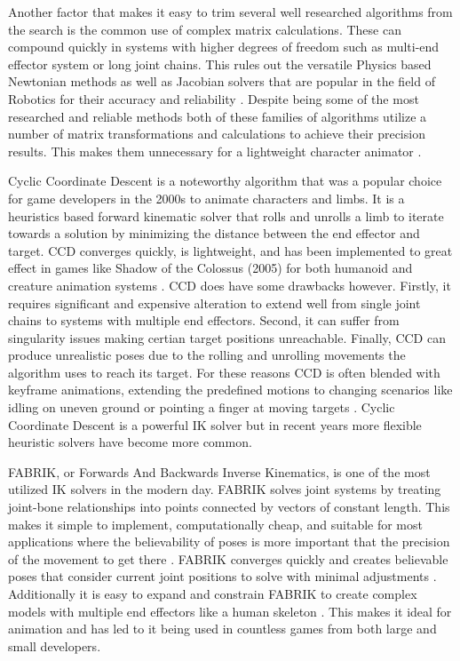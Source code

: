 \documentclass[10pt,twocolumn]{article}
\begin{document}
Another factor that makes it easy to trim several well researched algorithms from the search is the common use of complex matrix calculations. These can compound quickly in systems with higher degrees of freedom such as multi-end effector system or long joint chains. This rules out the versatile Physics based Newtonian methods as well as Jacobian solvers that are popular in the field of Robotics for their accuracy and reliability \cite{newtonian}\cite{jacobianSingularity}. Despite being some of the most researched and reliable methods both of these families of algorithms utilize a number of matrix transformations and calculations to achieve their precision results. This makes them unnecessary for a lightweight character animator \cite{litReview}.

Cyclic Coordinate Descent is a noteworthy algorithm that was a popular choice for game developers in the 2000s to animate characters and limbs. It is a heuristics based forward kinematic solver that rolls and unrolls a limb to iterate towards a solution by minimizing the distance between the end effector and target\cite{CCDBlog}. CCD converges quickly, is lightweight, and has been implemented to great effect in games like Shadow of the Colossus (2005) for both humanoid and creature animation systems \cite{ShadowofC}. CCD does have some drawbacks however. Firstly, it requires significant and expensive alteration to extend well from single joint chains to systems with multiple end effectors. Second, it can suffer from singularity issues making certian target positions unreachable. Finally, CCD can produce unrealistic poses due to the rolling and unrolling movements the algorithm uses to reach its target. For these reasons CCD is often blended with keyframe animations, extending the predefined motions to changing scenarios like idling on uneven ground or pointing a finger at moving targets \cite{baseFABRIK} \cite{CCDpaper}. Cyclic Coordinate Descent is a powerful IK solver but in recent years more flexible heuristic solvers have become more common.

FABRIK, or Forwards And Backwards Inverse Kinematics, is one of the most utilized IK solvers in the modern day. FABRIK solves joint systems by treating joint-bone relationships into points connected by vectors of constant length. This makes it simple to implement, computationally cheap, and suitable for most applications where the believability of poses is more important that the precision of the movement to get there \cite{FABRIKoptimized}. FABRIK converges quickly and creates believable poses that consider current joint positions to solve with minimal adjustments \cite{baseFABRIK}. Additionally it is easy to expand and constrain FABRIK to create complex models with multiple end effectors like a human skeleton \cite{extendFABRIK}. This makes it ideal for animation and has led to it being used in countless games from both large and small developers.
\end{document}
